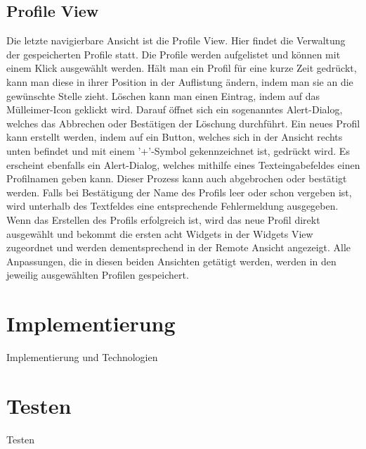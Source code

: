 \subsection{Profile View}
Die letzte navigierbare Ansicht ist die Profile View. Hier findet die Verwaltung der gespeicherten Profile statt. Die Profile werden aufgelistet und können mit einem Klick ausgewählt werden. Hält man ein Profil für eine kurze Zeit gedrückt, kann man diese in ihrer Position in der Auflistung ändern, indem man sie an die gewünschte Stelle zieht. Löschen kann man einen Eintrag, indem auf das Mülleimer-Icon geklickt wird. Darauf öffnet sich ein sogenanntes Alert-Dialog, welches das Abbrechen oder Bestätigen der Löschung durchführt. Ein neues Profil kann erstellt werden, indem auf ein Button, welches sich in der Ansicht rechts unten befindet und mit einem '+'-Symbol gekennzeichnet ist, gedrückt wird. Es erscheint ebenfalls ein Alert-Dialog, welches mithilfe eines Texteingabefeldes einen Profilnamen geben kann. Dieser Prozess kann auch abgebrochen oder bestätigt werden. Falls bei Bestätigung der Name des Profils leer oder schon vergeben ist, wird unterhalb des Textfeldes eine entsprechende Fehlermeldung ausgegeben. Wenn das Erstellen des Profils erfolgreich ist, wird das neue Profil direkt ausgewählt und bekommt die ersten acht Widgets in der Widgets View zugeordnet und werden dementsprechend in der Remote Ansicht angezeigt. Alle Anpassungen, die in diesen beiden Ansichten getätigt werden, werden in den jeweilig ausgewählten Profilen gespeichert.

\section{Implementierung}
Implementierung und Technologien

\section{Testen}
Testen
